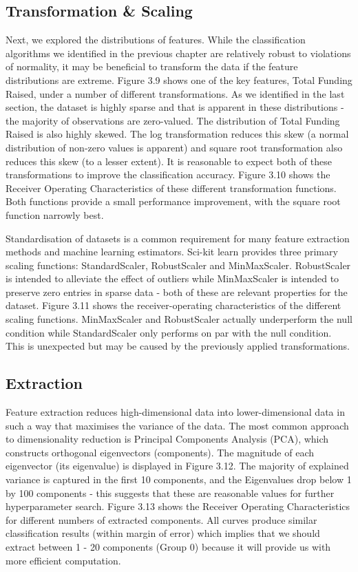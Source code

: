 \documentclass[../thesis/thesis.tex]{subfiles}
\begin{document}
\subsection{Transformation \& Scaling}

Next, we explored the distributions of features. While the classification algorithms we identified in the previous chapter are relatively robust to violations of normality, it may be beneficial to transform the data if the feature distributions are extreme. Figure 3.9 shows one of the key features, Total Funding Raised, under a number of different transformations. As we identified in the last section, the dataset is highly sparse and that is apparent in these distributions - the majority of observations are zero-valued. The distribution of Total Funding Raised is also highly skewed. The log transformation reduces this skew (a normal distribution of non-zero values is apparent) and square root transformation also reduces this skew (to a lesser extent). It is reasonable to expect both of these transformations to improve the classification accuracy. Figure 3.10 shows the Receiver Operating Characteristics of these different transformation functions. Both functions provide a small performance improvement, with the square root function narrowly best.

Standardisation of datasets is a common requirement for many feature extraction methods and machine learning estimators. Sci-kit learn provides three primary scaling functions: StandardScaler, RobustScaler and MinMaxScaler. RobustScaler is intended to alleviate the effect of outliers while MinMaxScaler is intended to preserve zero entries in sparse data - both of these are relevant properties for the dataset. Figure 3.11 shows the receiver-operating characteristics of the different scaling functions. MinMaxScaler and RobustScaler actually underperform the null condition while StandardScaler only performs on par with the null condition. This is unexpected but may be caused by the previously applied transformations.

\subsection{Extraction}

Feature extraction reduces high-dimensional data into lower-dimensional data in such a way that maximises the variance of the data. The most common approach to dimensionality reduction is Principal Components Analysis (PCA), which constructs orthogonal eigenvectors (components). The magnitude of each eigenvector (its eigenvalue) is displayed in Figure 3.12. The majority of explained variance is captured in the first 10 components, and the Eigenvalues drop below 1 by 100 components - this suggests that these are reasonable values for further hyperparameter search. Figure 3.13 shows the Receiver Operating Characteristics for different numbers of extracted components. All curves produce similar classification results (within margin of error) which implies that we should extract between 1 - 20 components (Group 0) because it will provide us with more efficient computation.
\end{document}
